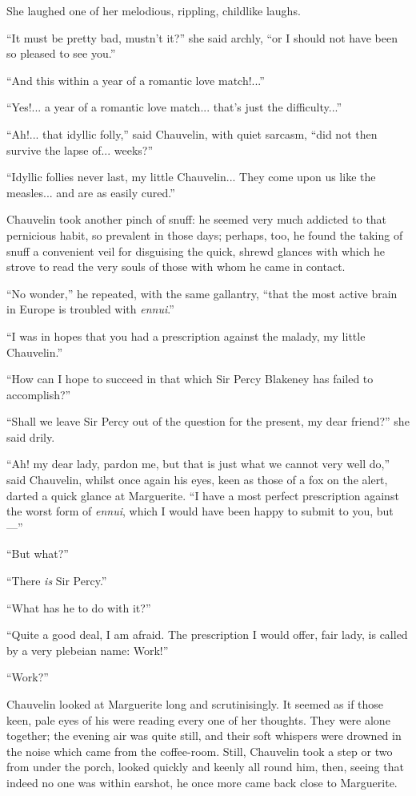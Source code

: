 \documentclass[paper=a5,BCOR=7mm,twoside,DIV=calc,12pt,usegeometry,chapterprefix,endperiod,headings=big]{scrbook}
\begin{document}
She laughed one of her melodious, rippling, childlike laughs.

\enquote{It must be pretty bad, mustn't it?} she said archly, \enquote{or I should not have been so pleased to see you.}

\enquote{And this within a year of a romantic love match!...}

\enquote{Yes!... a year of a romantic love match... that's just the difficulty...}

\enquote{Ah!... that idyllic folly,} said Chauvelin, with quiet sarcasm, \enquote{did not then survive the lapse of... weeks?}

\enquote{Idyllic follies never last, my little Chauvelin... They come upon us like the measles... and are as easily cured.}

Chauvelin took another pinch of snuff: he seemed very much addicted to that pernicious habit, so prevalent in those days; perhaps, too, he found the taking of snuff a convenient veil for disguising the quick, shrewd glances with which he strove to read the very souls of those with whom he came in contact.

\enquote{No wonder,} he repeated, with the same gallantry, \enquote{that the most active brain in Europe is troubled with \textit{ennui}.}

\enquote{I was in hopes that you had a prescription against the malady, my little Chauvelin.}

\enquote{How can I hope to succeed in that which Sir Percy Blakeney has failed to accomplish?}

\enquote{Shall we leave Sir Percy out of the question for the present, my dear friend?} she said drily.

\enquote{Ah! my dear lady, pardon me, but that is just what we cannot very well do,} said Chauvelin, whilst once again his eyes, keen as those of a fox on the alert, darted a quick glance at Marguerite. \enquote{I have a most perfect prescription against the worst form of \textit{ennui}, which I would have been happy to submit to you, but---}

\enquote{But what?}

\enquote{There \textit{is} Sir Percy.}

\enquote{What has he to do with it?}

\enquote{Quite a good deal, I am afraid. The prescription I would offer, fair lady, is called by a very plebeian name: Work!}

\enquote{Work?}

Chauvelin looked at Marguerite long and scrutinisingly. It seemed as if those keen, pale eyes of his were reading every one of her thoughts. They were alone together; the evening air was quite still, and their soft whispers were drowned in the noise which came from the coffee-room. Still, Chauvelin took a step or two from under the porch, looked quickly and keenly all round him, then, seeing that indeed no one was within earshot, he once more came back close to Marguerite.
\end{document}
